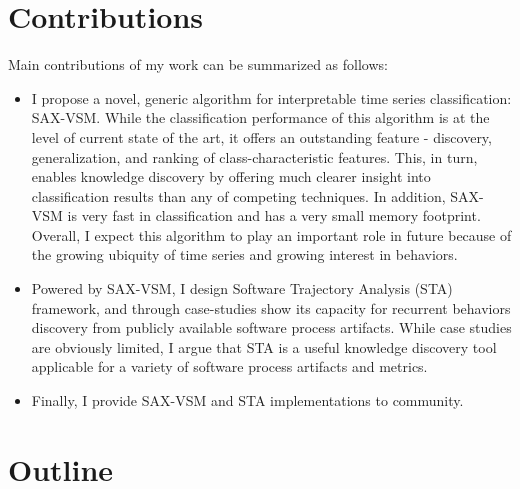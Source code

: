 \section{Contributions}\label{section_contributions}
Main contributions of my work can be summarized as follows: 
\begin{itemize}
\item I propose a novel, generic algorithm for interpretable time series classification: SAX-VSM. 
While the classification performance of this algorithm is at the level of current state of the art, 
it offers an outstanding feature - discovery, generalization, and ranking of class-characteristic features. 
This, in turn, enables knowledge discovery by offering much clearer insight into classification results than any of 
competing techniques.
In addition, SAX-VSM is very fast in classification and has a very small memory footprint. 
Overall, I expect this algorithm to play an important role in future because of the growing ubiquity of time series and 
growing interest in behaviors.
\item Powered by SAX-VSM, I design Software Trajectory Analysis (STA) framework, and through case-studies show its 
capacity for recurrent behaviors discovery from publicly available software process artifacts. While case studies are 
obviously limited, I argue that STA is a useful knowledge discovery tool applicable for a variety of software process 
artifacts and metrics. 
\item Finally, I provide SAX-VSM and STA implementations to community.
\end{itemize}

\section{Outline}\label{section_organization}